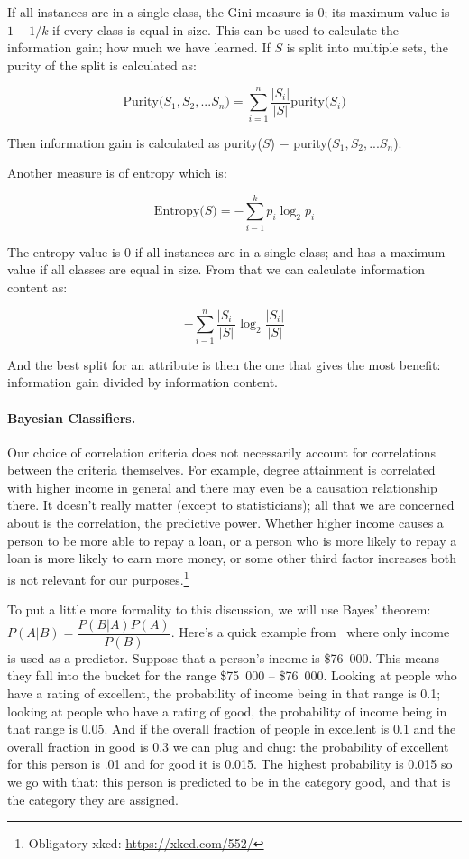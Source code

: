 \documentclass[a4paper]{report}
\begin{document}
If all instances are in a single class, the Gini measure is 0; its maximum value is $1-1/k$ if every class is equal in size. This can be used to calculate the information gain; how much we have learned. If $S$ is split into multiple sets, the purity of the split is calculated as:

$$\mbox{Purity($S_{1}, S_{2}, ... S_{n}$)} = \sum_{i = 1}^{n}\dfrac{|S_{i}|}{|S|} \mbox{purity($S_{i}$)}$$

Then information gain is calculated as purity($S$) $-$ purity($S_{1}, S_{2}, ... S_{n}$).

Another measure is of entropy which is:

$$\mbox{Entropy($S$)} = - \sum_{i-1}^{k}p_{i} \log_{2} p_{i}$$

The entropy value is 0 if all instances are in a single class; and has a maximum value if all classes are equal in size. From that we can calculate information content as:

$$ - \sum_{i-1}^{n} \dfrac{|S_{i}|}{|S|}  \log_{2} \dfrac{|S_{i}|}{|S|} $$

And the best split for an attribute is then the one that gives the most benefit: information gain divided by information content.

\paragraph{Bayesian Classifiers.} Our choice of correlation criteria does not necessarily account for correlations between the criteria themselves. For example, degree attainment is correlated with higher income  in general and there may even be a causation relationship there. It doesn't really matter (except to statisticians); all that we are concerned about is the correlation, the predictive power. Whether higher income causes a person to be more able to repay a loan, or a person who is more likely to repay a loan is more likely to earn more money, or some other third factor increases both is not relevant for our purposes.\footnote{Obligatory xkcd: \url{https://xkcd.com/552/} }

To put a little more formality to this discussion, we will use Bayes' theorem: $P(A|B) = \dfrac{P(B|A)P(A)}{P(B)}$. Here's a quick example  from~\cite{dsc} where only income is used as a predictor. Suppose that a person's income is \$76~000. This means they fall into the bucket for the range \$75~000 -- \$76~000. Looking at people who have a rating of excellent, the probability of income being in that range is 0.1; looking at people who have a rating of good, the probability of income being in that range is 0.05. And if the overall fraction of people in excellent is 0.1 and the overall fraction in good is 0.3 we can plug and chug: the probability of excellent for this person is .01 and for good it is 0.015. The highest probability is 0.015 so we go with that: this person is predicted to be in the category good, and that is the category they are assigned.
\end{document}
